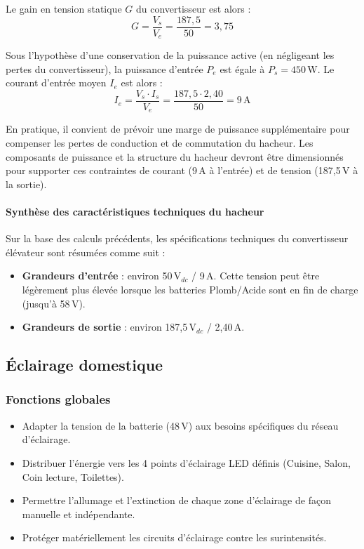 Le gain en tension statique $G$ du convertisseur est alors :
\begin{equation*}
    G = \frac{V_s}{V_e} = \frac{187,5}{50} = 3,75
\end{equation*}

Sous l'hypothèse d'une conservation de la puissance active (en négligeant les pertes du convertisseur), la puissance d'entrée $P_e$ est égale à $P_s = 450$\,W. Le courant d'entrée moyen $I_e$ est alors :
\begin{equation*}
    I_e = \frac{V_s \cdot I_s}{V_e} = \frac{187,5 \cdot 2,40}{50} = 9\,\text{A}
\end{equation*}

En pratique, il convient de prévoir une marge de puissance supplémentaire pour compenser les pertes de conduction et de commutation du hacheur. Les composants de puissance et la structure du hacheur devront être dimensionnés pour supporter ces contraintes de courant (9\,A à l'entrée) et de tension (187,5\,V à la sortie).

\paragraph{Synthèse des caractéristiques techniques du hacheur}

Sur la base des calculs précédents, les spécifications techniques du convertisseur élévateur sont résumées comme suit :
\begin{itemize}
    \item \textbf{Grandeurs d'entrée} : environ 50\,V$_{dc}$ / 9\,A. Cette tension peut être légèrement plus élevée lorsque les batteries Plomb/Acide sont en fin de charge (jusqu'à 58\,V).
    \item \textbf{Grandeurs de sortie} : environ 187,5\,V$_{dc}$ / 2,40\,A.
\end{itemize}

\subsection{Éclairage domestique}



\subsubsection{Fonctions globales}
\begin{itemize}
    \item Adapter la tension de la batterie (48\,V) aux besoins spécifiques du réseau d'éclairage.
    \item Distribuer l'énergie vers les 4 points d'éclairage LED définis (Cuisine, Salon, Coin lecture, Toilettes).
    \item Permettre l'allumage et l'extinction de chaque zone d'éclairage de façon manuelle et indépendante.
    \item Protéger matériellement les circuits d'éclairage contre les surintensités.
\end{itemize}

